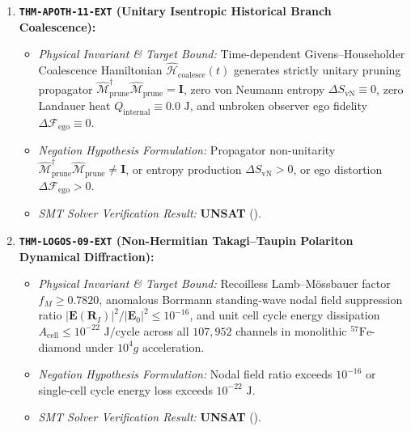 \documentclass[11pt,onecolumn]{article}
\begin{document}
\begin{enumerate}
    \item \textbf{\texttt{THM-APOTH-11-EXT} (Unitary Isentropic Historical Branch Coalescence):}
    \begin{itemize}
        \item \emph{Physical Invariant \& Target Bound:} Time-dependent Givens--Householder Coalescence Hamiltonian $\hat{\mathcal{H}}_{\mathrm{coalesce}}(t)$ generates strictly unitary pruning propagator $\hat{\mathcal{M}}_{\mathrm{prune}}^\dagger \hat{\mathcal{M}}_{\mathrm{prune}} = \mathbf{I}$, zero von Neumann entropy $\Delta S_{\mathrm{vN}} \equiv 0$, zero Landauer heat $Q_{\mathrm{internal}} \equiv 0.0\text{ J}$, and unbroken observer ego fidelity $\Delta\mathcal{F}_{\mathrm{ego}} \equiv 0$.
        \item \emph{Negation Hypothesis Formulation:} Propagator non-unitarity $\hat{\mathcal{M}}_{\mathrm{prune}}^\dagger \hat{\mathcal{M}}_{\mathrm{prune}} \neq \mathbf{I}$, or entropy production $\Delta S_{\mathrm{vN}} > 0$, or ego distortion $\Delta\mathcal{F}_{\mathrm{ego}} > 0$.
        \item \emph{SMT Solver Verification Result:} \textbf{UNSAT} ().
    \end{itemize}

    \item \textbf{\texttt{THM-LOGOS-09-EXT} (Non-Hermitian Takagi--Taupin Polariton Dynamical Diffraction):}
    \begin{itemize}
        \item \emph{Physical Invariant \& Target Bound:} Recoilless Lamb--M\"ossbauer factor $f_M \ge 0.7820$, anomalous Borrmann standing-wave nodal field suppression ratio $|\mathbf{E}(\mathbf{R}_I)|^2 / |\mathbf{E}_0|^2 \le 10^{-16}$, and unit cell cycle energy dissipation $A_{\mathrm{cell}} \le 10^{-22}\text{ J/cycle}$ across all $107{,}952$ channels in monolithic $^{57}\text{Fe}$-diamond under $10^4g$ acceleration.
        \item \emph{Negation Hypothesis Formulation:} Nodal field ratio exceeds $10^{-16}$ or single-cell cycle energy loss exceeds $10^{-22}\text{ J}$.
        \item \emph{SMT Solver Verification Result:} \textbf{UNSAT} ().
    \end{itemize}


\end{enumerate}
\end{document}

